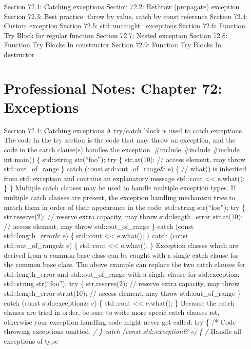 Section 72.1: Catching exceptions Section 72.2: Rethrow (propagate)
exception Section 72.3: Best practice: throw by value, catch by const
reference Section 72.4: Custom exception Section 72.5:
std::uncaught\_exceptions Section 72.6: Function Try Block for regular
function Section 72.7: Nested exception Section 72.8: Function Try
Blocks In constructor Section 72.9: Function Try Blocks In destructor

\hypertarget{professional-notes-chapter-72-exceptions-1}{%
\section{Professional Notes: Chapter 72:
Exceptions}\label{professional-notes-chapter-72-exceptions-1}}

Section 72.1: Catching exceptions A try/catch block is used to catch
exceptions. The code in the try section is the code that may throw an
exception, and the code in the catch clause(s) handles the exception.
\#include \#include \#include int main() \{ std::string str(``foo'');
try \{ str.at(10); // access element, may throw std::out\_of\_range \}
catch (const std::out\_of\_range\& e) \{ // what() is inherited from
std::exception and contains an explanatory message std::cout
\textless\textless{} e.what(); \} \} Multiple catch clauses may be used
to handle multiple exception types. If multiple catch clauses are
present, the exception handling mechanism tries to match them in order
of their appearance in the code: std::string str(``foo''); try \{
str.reserve(2); // reserve extra capacity, may throw std::length\_error
str.at(10); // access element, may throw std::out\_of\_range \} catch
(const std::length\_error\& e) \{ std::cout \textless\textless{}
e.what(); \} catch (const std::out\_of\_range\& e) \{ std::cout
\textless\textless{} e.what(); \} Exception classes which are derived
from a common base class can be caught with a single catch clause for
the common base class. The above example can replace the two catch
clauses for std::length\_error and std::out\_of\_range with a single
clause for std:exception: std::string str(``foo''); try \{
str.reserve(2); // reserve extra capacity, may throw std::length\_error
str.at(10); // access element, may throw std::out\_of\_range \} catch
(const std::exception\& e) \{ std::cout \textless\textless{} e.what();
\} Because the catch clauses are tried in order, be sure to write more
specic catch clauses rst, otherwise your exception handling code might
never get called: try \{ /* Code throwing exceptions omitted. \emph{/ \}
catch (const std::exception\& e) \{ /} Handle all exceptions of type
